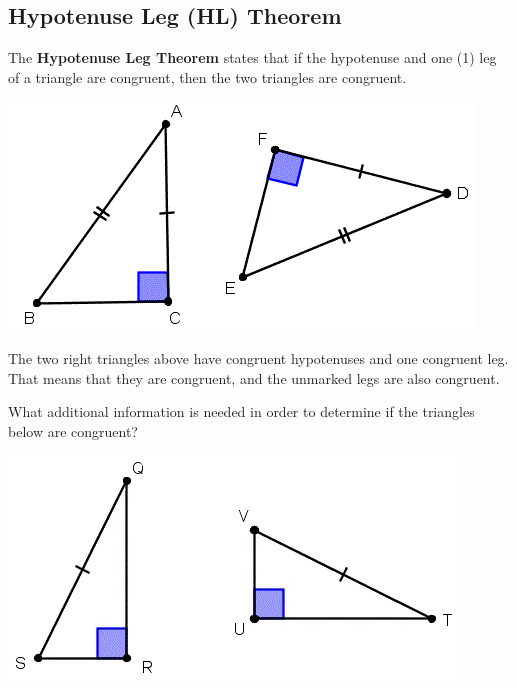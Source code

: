 \documentclass[12pt]{article}
\begin{document}
\hrulefill

\subsection*{Hypotenuse Leg (HL) Theorem}

The \textbf{Hypotenuse Leg Theorem} states that if the hypotenuse and one (1) leg of a triangle are congruent, then the two triangles are congruent. \\

\begin{center}
\includegraphics[scale=.5]{triangle10.png}
\end{center}

The two right triangles above have congruent hypotenuses and one congruent leg. That means that they are congruent, and the unmarked legs are also congruent.\\

\hrulefill

What additional information is needed in order to determine if the triangles below are congruent?\\

\begin{center}
\includegraphics[scale=.5]{triangle12.png}
\end{center}
\end{document}
